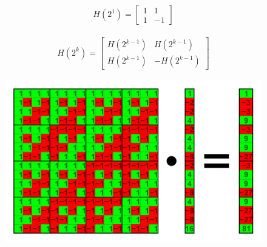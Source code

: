 {\begin{equation*}
\begin{aligned}
    H(2^1) =
    \begin{bmatrix}
        1 & 1\\
        1 & -1
    \end{bmatrix}
\end{aligned}
\end{equation*}

\begin{equation*}
\begin{aligned}
    H(2^k) =
    \begin{bmatrix}
        H(2^{k-1}) & H(2^{k-1})\\
        H(2^{k-1}) & -H(2^{k-1})
    \end{bmatrix}
\end{aligned}
\end{equation*}

\begin{figure}[H]
    \includegraphics[width=15cm]{Images/Walsh.png}
    \centering
    \caption{}
\end{figure}
}
